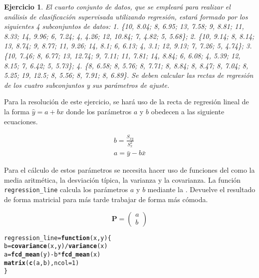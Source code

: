 \documentclass[12pt]{report}\usepackage[]{graphicx}\usepackage[dvipsnames]{xcolor}
\makeatletter
\newcommand{\hlnum}[1]{\textcolor[rgb]{0.686,0.059,0.569}{#1}}%
\newcommand{\hlopt}[1]{\textcolor[rgb]{0,0,0}{#1}}%
\newcommand{\hlstd}[1]{\textcolor[rgb]{0.345,0.345,0.345}{#1}}%
\newcommand{\hlkwa}[1]{\textcolor[rgb]{0.161,0.373,0.58}{\textbf{#1}}}%
\newcommand{\hlkwb}[1]{\textcolor[rgb]{0.69,0.353,0.396}{#1}}%
\newcommand{\hlkwc}[1]{\textcolor[rgb]{0.333,0.667,0.333}{#1}}%
\newcommand{\hlkwd}[1]{\textcolor[rgb]{0.737,0.353,0.396}{\textbf{#1}}}%
\newenvironment{kframe}{%
 \def\at@end@of@kframe{}%
 \ifinner\ifhmode%
  \def\at@end@of@kframe{\end{minipage}}%
  \begin{minipage}{\columnwidth}%
 \fi\fi%
 \def\FrameCommand##1{\hskip\@totalleftmargin \hskip-\fboxsep
 \colorbox{shadecolor}{##1}\hskip-\fboxsep
     \hskip-\linewidth \hskip-\@totalleftmargin \hskip\columnwidth}%
 \MakeFramed {\advance\hsize-\width
   \@totalleftmargin\z@ \linewidth\hsize
   \@setminipage}}%
 {\par\unskip\endMakeFramed%
 \at@end@of@kframe}
\newenvironment{knitrout}{}{} %
\newtheorem{exercise}{Ejercicio}[section]
\makeatother
\begin{document}
 				\begin{exercise}
 					El cuarto conjunto de datos, que se empleará para realizar el análisis de clasificación supervisada utilizando regresión, estará formado por los siguientes 4 subconjuntos de datos: 1. \{10, 8.04; 8, 6.95; 13, 7.58; 9, 8.81; 11, 8.33; 14, 9.96; 6, 7.24; 4, 4.26; 12, 10.84; 7, 4.82; 5, 5.68\}; 2. \{10, 9.14; 8, 8.14; 13, 8.74; 9, 8.77; 11, 9.26; 14, 8.1; 6, 6.13; 4, 3.1; 12, 9.13; 7, 7.26; 5, 4.74\}; 3. \{10, 7.46; 8, 6.77; 13, 12.74; 9, 7.11; 11, 7.81; 14, 8.84; 6, 6.08; 4, 5.39; 12, 8.15; 7, 6.42; 5, 5.73\}; 4. \{8, 6.58; 8, 5.76; 8, 7.71; 8, 8.84; 8, 8.47; 8, 7.04; 8, 5.25; 19, 12.5; 8, 5.56; 8, 7.91; 8, 6.89\}. Se deben calcular las rectas de regresión de los cuatro subconjuntos y sus parámetros de ajuste.
 				\end{exercise}
 				
 				Para la resolución de este ejercicio, se hará uso de la recta de regresión lineal de la forma $\hat{y} = a + bx$ donde los parámetros $a$ y $b$ obedecen a las siguiente ecuaciones. 
 				
 				\begin{equation}\label{ec:reg_param}
 					\begin{gathered}
 						b = \frac{S_{xy}}{S^2_x}\\
 						a = \bar{y} - b \bar{x}
 					\end{gathered}
 				\end{equation}
 				
 				Para el cálculo de estos parámetros se necesita hacer uso de funciones del  como la media aritmética, la desviación típica, la varianza y la covarianza. La función \texttt{regression\_line} calcula los parámetros $a$ y $b$ mediante la . Devuelve el resultado de forma matricial para más tarde trabajar de forma más cómoda. 
 				
 				$$
 				\textbf{P} = \begin{pmatrix}
 					a\\
 					b
 				\end{pmatrix}
 				$$
 				
\begin{knitrout}
\color{fgcolor}\begin{kframe}
\begin{alltt}
\hlstd{regression_line} \hlkwb{=} \hlkwa{function}\hlstd{(}\hlkwc{x}\hlstd{,} \hlkwc{y}\hlstd{) \{}
        \hlstd{b} \hlkwb{=} \hlkwd{covariance}\hlstd{(x, y)} \hlopt{/} \hlkwd{variance}\hlstd{(x)}
        \hlstd{a} \hlkwb{=} \hlkwd{fcd_mean}\hlstd{(y)} \hlopt{-} \hlstd{b} \hlopt{*} \hlkwd{fcd_mean}\hlstd{(x)}
        \hlkwd{matrix}\hlstd{(}\hlkwd{c}\hlstd{(a, b),} \hlkwc{ncol} \hlstd{=} \hlnum{1}\hlstd{)}
\hlstd{\}}
\end{alltt}
\end{kframe}
\end{knitrout}
 				
\end{document}
